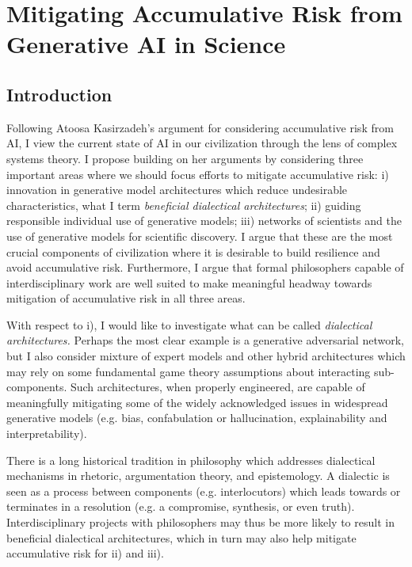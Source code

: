 \documentclass[11pt, oneside]{article}   	%
\begin{document}
\section{Mitigating Accumulative Risk from Generative AI in Science}


\subsection{Introduction}

Following Atoosa Kasirzadeh’s argument for considering accumulative risk from AI, I view the current state of AI in our civilization through the lens of complex systems theory. I propose building on her arguments by considering three important areas where we should focus efforts to mitigate accumulative risk: i) innovation in generative model architectures which reduce undesirable characteristics, what I term \emph{beneficial dialectical architectures}; ii) guiding responsible individual use of generative models; iii) networks of scientists and the use of generative models for scientific discovery. I argue that these are the most crucial components of civilization where it is desirable to build resilience and avoid accumulative risk.  Furthermore, I argue that formal philosophers capable of interdisciplinary work are well suited to make meaningful headway towards mitigation of accumulative risk in all three areas.



With respect to i), I would like to investigate what can be called \emph{dialectical architectures.}  Perhaps the most clear example is a generative adversarial network, but I also consider mixture of expert models and other hybrid architectures which may rely on some fundamental game theory assumptions about interacting sub-components.  Such architectures, when properly engineered, are capable of meaningfully mitigating some of the widely acknowledged issues in widespread generative models (e.g. bias, confabulation or hallucination, explainability and interpretability). 

There is a long historical tradition in philosophy which addresses dialectical mechanisms in rhetoric, argumentation theory, and epistemology.  A dialectic is seen as a process between components (e.g. interlocutors) which leads towards or terminates in a resolution (e.g. a compromise, synthesis, or even truth).  Interdisciplinary projects with philosophers may thus be more likely to result in beneficial dialectical architectures, which in turn may also help mitigate accumulative risk for ii) and iii).
\end{document}
